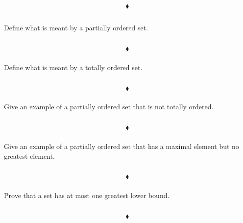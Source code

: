 $$\blacklozenge$$

\renewcommand{\thesubsection}{\thesection.\RomanNumeralCaps{10}}
\subsection{}
\subsubsection{}
\begin{tcolorbox}
Define what is meant by a partially ordered set.
\end{tcolorbox}
$$ $$

$$\blacklozenge$$

\subsubsection{}
\begin{tcolorbox}
Define what is meant by a totally ordered set.
\end{tcolorbox}
$$ $$

$$\blacklozenge$$

\subsubsection{}
\begin{tcolorbox}
Give an example of a partially ordered set that is not totally ordered.  
\end{tcolorbox}
$$ $$

$$\blacklozenge$$

\subsubsection{}
\begin{tcolorbox}
Give an example of a partially ordered set that has a maximal element but no greatest element. 
\end{tcolorbox}
$$ $$

$$\blacklozenge$$

\subsubsection{}
\begin{tcolorbox}
Prove that a set has at most one greatest lower bound. 
\end{tcolorbox}
$$ $$

$$\blacklozenge$$



